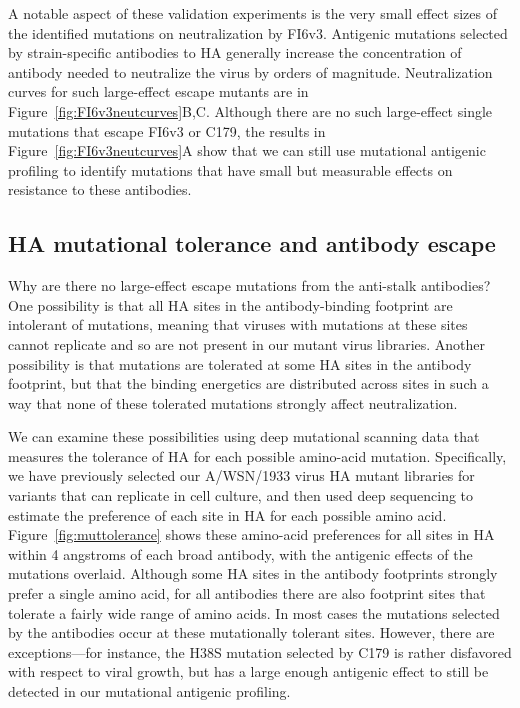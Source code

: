 \documentclass[11pt]{article}
\begin{document}
A notable aspect of these validation experiments is the very small effect sizes of the identified mutations on neutralization by FI6v3.
Antigenic mutations selected by strain-specific antibodies to HA generally increase the concentration of antibody needed to neutralize the virus by orders of magnitude.
Neutralization curves for such large-effect escape mutants are in Figure~\ref{fig:FI6v3neutcurves}B,C.
Although there are no such large-effect single mutations that escape FI6v3 or C179, the results in Figure~\ref{fig:FI6v3neutcurves}A show that we can still use mutational antigenic profiling to identify mutations that have small but measurable effects on resistance to these antibodies.

\subsection*{HA mutational tolerance and antibody escape}
Why are there no large-effect escape mutations from the anti-stalk antibodies?
One possibility is that all HA sites in the antibody-binding footprint are intolerant of mutations, meaning that viruses with mutations at these sites cannot replicate and so are not present in our mutant virus libraries.
Another possibility is that mutations are tolerated at some HA sites in the antibody footprint, but that the binding energetics are distributed across sites in such a way that none of these tolerated mutations strongly affect neutralization.

We can examine these possibilities using deep mutational scanning data that measures the tolerance of HA for each possible amino-acid mutation.
Specifically, we have previously selected our A/WSN/1933 virus HA mutant libraries for variants that can replicate in cell culture, and then used deep sequencing to estimate the preference of each site in HA for each possible amino acid\cite{doud2016accurate}.
Figure~\ref{fig:muttolerance} shows these amino-acid preferences for all sites in HA within 4 angstroms of each broad antibody, with the antigenic effects of the mutations overlaid.
Although some HA sites in the antibody footprints strongly prefer a single amino acid, for all antibodies there are also footprint sites that tolerate a fairly wide range of amino acids.
In most cases the mutations selected by the antibodies occur at these mutationally tolerant sites.
However, there are exceptions---for instance, the H38S mutation selected by C179 is rather disfavored with respect to viral growth, but has a large enough antigenic effect to still be detected in our mutational antigenic profiling.
\end{document}
